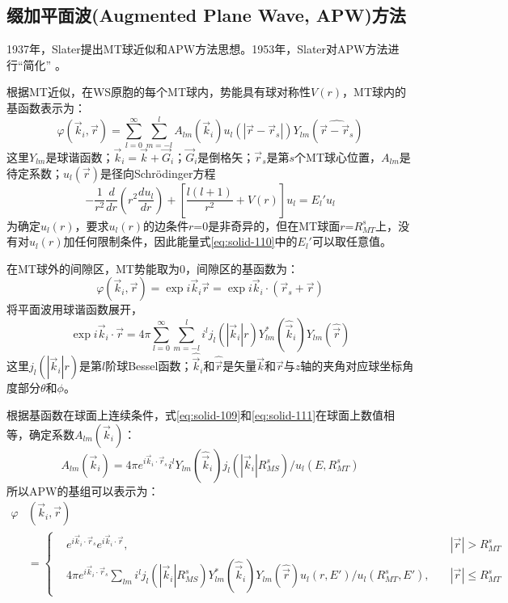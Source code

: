 \subsection{缀加平面波(Augmented Plane Wave, APW)方法}
1937年，Slater提出MT球近似和APW方法思想\cite{PR51-846_1937}。1953年，Slater对APW方法进行“简化”\cite{PR91-528_1953}%
。

根据MT近似，在WS原胞的每个MT球内，势能具有球对称性$V(r)$，MT球内的基函数表示为：
\begin{equation}
  \varphi(\vec k_i,\vec r)=\sum_{l=0}^{\infty}\sum_{m=-l}^lA_{lm}(\vec k_i)u_l(|\vec r-\vec r_s|)Y_{lm}(\widehat{\vec r-\vec r_s})
  \label{eq:solid-109}
\end{equation}
这里$Y_{lm}$是球谐函数；$\vec k_i=\vec k+\vec G_i$；$\vec G_i$是倒格矢；$\vec r_s$是第$s$个MT球心位置，$A_{lm}$是待定系数；$u_l(\vec r)$是径向Schr\"odinger方程
\begin{equation}
  -\frac1{r^2}\frac d{dr}\left(r^2\frac{du_l}{dr}\right)+\left[\frac{l(l+1)}{r^2}+V(r)\right]u_l=E_l'u_l
  \label{eq:solid-110}
\end{equation}
为确定$u_l(r)$，要求$u_l(r)$的边条件$r$=0是非奇异的，但在MT球面$r$=$R_{MT}^s$上，没有对$u_l(r)$加任何限制条件，因此能量式\eqref{eq:solid-110}中的$E_l'$可以取任意值。

在MT球外的间隙区，MT势能取为0，间隙区的基函数为：
\begin{equation}
  \varphi(\vec k_i,\vec r)=\exp i\vec k_i\vec r=\exp i\vec k_i\cdot(\vec r_s+\vec r)
  \label{eq:solid-111}
\end{equation}
将平面波用球谐函数展开，
\begin{equation}
  \exp i\vec k_i\cdot\vec r=4\pi\sum_{l=0}^{\infty}\sum_{m=-l}^li^lj_l(|\vec k_i|r)Y_{lm}^{\ast}(\hat{\vec k}_i)Y_{lm}(\hat{\vec r})
  \label{eq:solid-112}
\end{equation}
这里$j_l(|\vec k_i|r)$是第$l$阶球Bessel函数；$\hat{\vec k}_i$和$\hat{\vec r}$是矢量$\vec k$和$\vec r$与$z$轴的夹角对应球坐标角度部分$\theta$和$\phi$。

根据基函数在球面上连续条件，式\eqref{eq:solid-109}和\eqref{eq:solid-111}在球面上数值相等，确定系数$A_{lm}(\vec k_i)$：
$$A_{lm}(\vec k_i)=4\pi e^{i\vec k_i\cdot\vec r_s}i^lY_{lm}(\hat{\vec k}_i)j_l(|\vec k_i|R_{MS}^s)/u_l(E,R_{MT}^s)$$
所以APW的基组可以表示为：
\begin{equation}
  \begin{split}
    \varphi&(\vec k_i,\vec r)\\
    &=\left\{\begin{aligned}
    &e^{i\vec k_i\cdot\vec r_s}e^{i\vec k_i\cdot\vec r},&|\vec r|>R_{MT}^s\\
    &4\pi e^{i\vec k_i\cdot\vec r_s}\sum_{lm}i^lj_l(|\vec k_i|R_{MS}^s)Y_{lm}^{\ast}(\hat{\vec k}_i)Y_{lm}(\hat{\vec r})u_l(r,E')/u_l(R_{MT}^s,E'),\quad&|\vec r|\leqslant R_{MT}^s
    \end{aligned} \right.
  \end{split}
  \label{eq:solid-113}
\end{equation}

